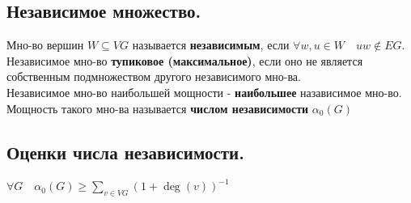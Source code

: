 \documentclass[12pt]{article}
\begin{document}
\subsection{Независимое множество.}
	Мно-во вершин $W\subseteq VG$ называется \textbf{независимым}, если $\forall w, u \in W \quad uw\not\in EG$.\\
		Независимое мно-во \textbf{тупиковое (максимальное)}, если оно не является собственным подмножеством другого независимого мно-ва.\\
	Независимое мно-во наибольшей мощности - \textbf{наибольшее} назависимое мно-во. Мощность такого мно-ва называется \textbf{числом независимости} $\alpha_0(G)$
\subsection{Оценки числа независимости.}
	$ \displaystyle \forall G \quad \alpha_0(G) \ge \sum_{v \in VG} (1+ \operatorname{deg}(v))^{-1}$
\end{document}
